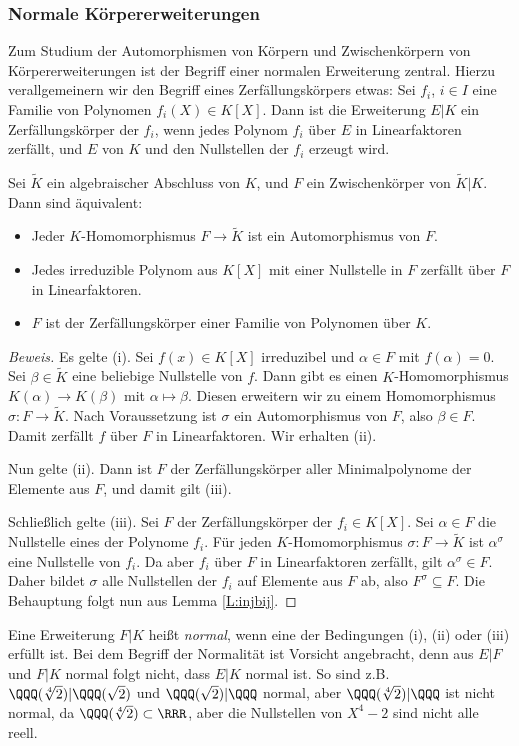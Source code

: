 \documentclass[12pt,a4paper,twoside]{article}
\newcommand{\ei}[1]{\emph{#1}\index{#1}}
\begin{document}
\subsubsection{Normale K\"orpererweiterungen}
Zum Studium der Automorphismen von K\"orpern und Zwischenk\"orpern von
K\"orpererweiterungen ist der Begriff einer normalen Erweiterung
zentral. Hierzu verallgemeinern wir den Begriff eines Zerf\"allungsk\"orpers
etwas: Sei $f_i$, $i\in I$ eine Familie von Polynomen $f_i(X)\in K[X]$. Dann
ist die Erweiterung $E|K$ ein Zerf\"allungsk\"orper der $f_i$, wenn jedes
Polynom $f_i$ \"uber $E$ in Linearfaktoren zerf\"allt, und $E$ von $K$ und den
Nullstellen der $f_i$ erzeugt wird.
\begin{Satz}
  Sei $\tilde K$ ein algebraischer Abschluss von $K$, und $F$ ein
  Zwischenk\"orper von $\tilde K|K$. Dann sind \"aquivalent:
  \begin{itemize}
  \item[(i)] Jeder $K$-Homomorphismus $F\to\tilde K$ ist ein Automorphismus
  von $F$.
\item[(ii)] Jedes irreduzible Polynom aus $K[X]$ mit einer Nullstelle in $F$
  zerf\"allt \"uber $F$ in Linearfaktoren.
\item[(iii)] $F$ ist der Zerf\"allungsk\"orper einer Familie von Polynomen
  \"uber $K$.
  \end{itemize}
\end{Satz}
\begin{proof}[Beweis]
  Es gelte (i). Sei $f(x)\in K[X]$ irreduzibel und $\alpha\in F$ mit
  $f(\alpha)=0$. Sei $\beta\in\tilde K$ eine beliebige Nullstelle von $f$.
  Dann gibt es einen $K$-Homomorphismus $K(\alpha)\to K(\beta)$ mit
  $\alpha\mapsto\beta$. Diesen erweitern wir zu einem Homomorphismus
  $\sigma:F\to\tilde K$. Nach Voraussetzung ist $\sigma$ ein Automorphismus
  von $F$, also $\beta\in F$. Damit zerf\"allt $f$ \"uber $F$ in
  Linearfaktoren. Wir erhalten (ii).
  
  Nun gelte (ii). Dann ist $F$ der Zerf\"allungsk\"orper aller Minimalpolynome
  der Elemente aus $F$, und damit gilt (iii).
  
  Schlie\ss lich gelte (iii). Sei $F$ der Zerf\"allungsk\"orper der $f_i\in
  K[X]$. Sei $\alpha\in F$ die Nullstelle eines der Polynome $f_i$. F\"ur
  jeden $K$-Homomorphismus $\sigma:F\to\tilde K$ ist $\alpha^\sigma$ eine
  Nullstelle von $f_i$. Da aber $f_i$ \"uber $F$ in Linearfaktoren zerf\"allt,
  gilt $\alpha^\sigma\in F$. Daher bildet $\sigma$ alle Nullstellen der $f_i$
  auf Elemente aus $F$ ab, also $F^\sigma\subseteq F$. Die Behauptung folgt
  nun aus Lemma \ref{L:injbij}.
\end{proof}
Eine Erweiterung $F|K$ hei\ss t \ei{normal}, wenn eine der Bedingungen (i),
(ii) oder (iii) erf\"ullt ist. Bei dem Begriff der Normalit\"at ist Vorsicht
angebracht, denn aus $E|F$ und $F|K$ normal folgt nicht, dass $E|K$ normal
ist. So sind z.B.\ $\QQQ(\sqrt[4]{2})|\QQQ(\sqrt{2})$ und
$\QQQ(\sqrt{2})|\QQQ$ normal, aber $\QQQ(\sqrt[4]{2})|\QQQ$ ist nicht normal,
da $\QQQ(\sqrt[4]{2})\subset\RRR$, aber die Nullstellen von $X^4-2$ sind nicht
alle reell.
\end{document}

